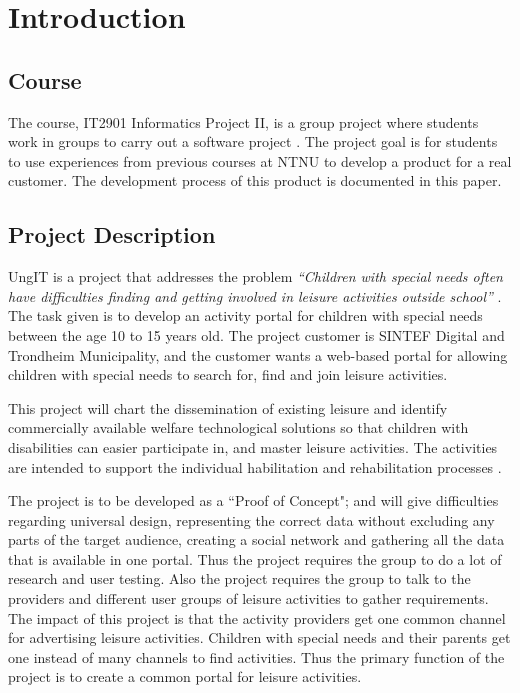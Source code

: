 
\chapter{Introduction}

\section{Course}
The course, IT2901 Informatics Project II, is a group project where students work in groups to carry out a software project \cite{EmneKode}. The project goal is for students to use experiences from previous courses at NTNU to develop a product for a real customer. The development process of this product is documented in this paper.


\section{Project Description}
UngIT is a project that addresses the problem \textit{“Children with special needs often have difficulties finding and getting involved in leisure activities outside school”} \cite{SintefBachelorProjectDescription}. The task given is to develop an activity portal for children with special needs between the age 10 to 15 years old. The project customer is SINTEF Digital and Trondheim Municipality, and the customer wants a web-based portal for allowing children with special needs to search for, find and join leisure activities.

This project will chart the dissemination of existing leisure and identify commercially available welfare technological solutions so that children with disabilities can easier participate in, and master leisure activities. The activities are intended to support the individual habilitation and rehabilitation processes \cite{SintefOnlineProjectDescription}.

The project is to be developed as a “Proof of Concept"; and will give difficulties regarding universal design, representing the correct data without excluding any parts of the target audience, creating a social network and gathering all the data that is available in one portal. Thus the project requires the group to do a lot of research and user testing. Also the project requires the group to talk to the providers and different user groups of leisure activities to gather requirements. The impact of this project is that the activity providers get one common channel for advertising leisure activities. Children with special needs and their parents get one instead of many channels to find activities. Thus the primary function of the project is to create a common portal for leisure activities.

